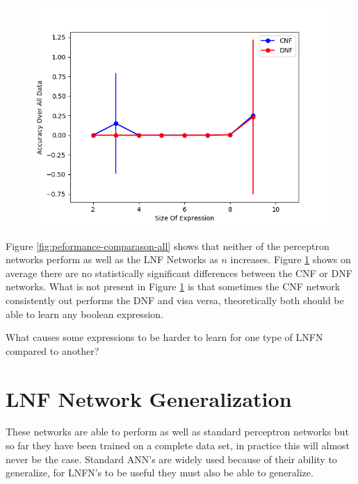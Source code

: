 \begin{figure}[H]
  \centering
  \begin{minipage}[b]{0.8\textwidth}
    \includegraphics[width=\textwidth]{CNFvsDNF.png}
    \caption{}
    \label{fig:peformance-comparason-cnfdnf}
  \end{minipage}
  \hfill
\end{figure}

Figure  \ref{fig:peformance-comparason-all} shows that neither of the perceptron networks perform as well as the LNF Networks as $n$ increases. Figure  \ref{fig:peformance-comparason-cnfdnf} shows on average there are no statistically significant differences between the CNF or DNF networks. What is not present in Figure \ref{fig:peformance-comparason-cnfdnf} is that sometimes the CNF network consistently out performs the DNF and visa versa, theoretically both should be able to learn any boolean expression.

What causes some expressions to be harder to learn for one type of LNFN compared to another? 

\section{LNF Network Generalization} \label{sec:lnfn-generalization}
These networks are able to perform as well as standard perceptron networks but so far they have been trained on a complete data set, in practice this will almost never be the case. Standard ANN's are widely used because of their ability to generalize, for LNFN's to be useful they must also be able to generalize.

